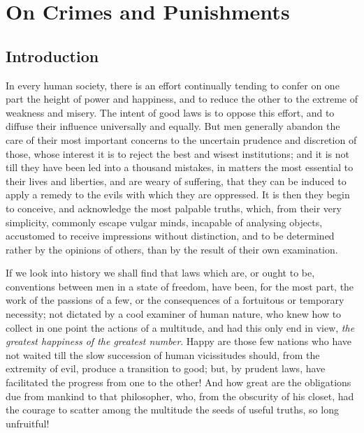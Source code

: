 
\author{Cesare Beccaria}
\chapter[On Crimes and Punishments, excerpt]{On Crimes and Punishments}

\section{Introduction}

In every human society, there is an effort continually tending to
confer on one part the height of power and happiness, and to reduce
the other to the extreme of weakness and misery. The intent of good
laws is to oppose this effort, and to diffuse their influence
universally and equally. But men generally abandon the care of their
most important concerns to the uncertain prudence and discretion of
those, whose interest it is to reject the best and wisest
institutions; and it is not till they have been led into a thousand
mistakes, in matters the most essential to their lives and liberties,
and are weary of suffering, that they can be induced to apply a remedy
to the evils with which  they are oppressed. It is then they
begin to conceive, and acknowledge the most palpable truths, which,
from their very simplicity, commonly escape vulgar minds, incapable of
analysing objects, accustomed to receive impressions without
distinction, and to be determined rather by the opinions of others,
than by the result of their own examination.

If we look into history we shall find that laws which are, or ought to
be, conventions between men in a state of freedom, have been, for the
most part, the work of the passions of a few, or the consequences of a
fortuitous or temporary necessity; not dictated by a cool examiner of
human nature, who knew how to collect in one point the actions of a
multitude, and had this only end in view, \textit{the greatest
happiness of the greatest number}. Happy are those few nations who
have not waited till the slow succession of human vicissitudes should,
from the extremity of evil, produce a transition to good; but, by
prudent laws, have facilitated the progress from one to the other! And
how great are the obligations due from mankind to that philosopher,
who, from the obscurity of his closet, had the courage to scatter
among the multitude the seeds of useful truths, so long unfruitful!

